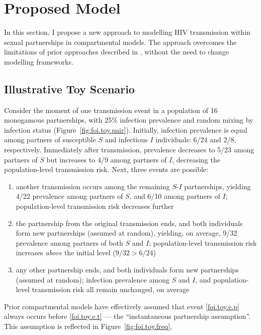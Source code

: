 \clearpage %
\section{Proposed Model}\label{foi.prop}
In this section, I propose a new approach to
modelling HIV transmission within sexual partnerships in compartmental models.
The approach overcomes the limitations of prior approaches described in ,
without the need to change modelling frameworks.
\subsection{Illustrative Toy Scenario}\label{foi.prop.toy}
Consider the moment of one transmission event
in a population of 16 monogamous partnerships, with 25\% infection prevalence
and random mixing by infection status (Figure~\ref{fig:foi.toy.pair}).
Initially, infection prevalence is equal among partners of
susceptible $S$ and infectious $I$ individuals: 6/24 and 2/8, respectively.
Immediately after transmission,
prevalence decreases to 5/23 among partners of $S$ but increases to 4/9 among partners of $I$,
decreasing the population-level transmission risk.
Next, three events are possible:
\begin{enumerate}[label=(\alph*)]
  \item \label{foi.toy.e.t}
  another transmission occurs among the remaining $S$-$I$ partnerships,
  yielding 4/22 prevalence among partners of $S$, and 6/10 among partners of $I$;
  population-level transmission risk decreases further
  \item \label{foi.toy.e.p}
  the partnership from the original transmission ends,
  and both individuals form new partnerships (assumed at random),
  yielding, on average, 9/32 prevalence among partners of both $S$ and $I$;
  population-level transmission risk increases \emph{above} the initial level ($9/32 > 6/24$)
  \item \label{foi.toy.e.q}
  any other partnership ends,
  and both individuals form new partnerships (assumed at random);
  infection prevalence among $S$ and $I$, and population-level transmission risk
  all remain unchanged, on average
\end{enumerate}
Prior compartmental models have effectively assumed that
event \ref{foi.toy.e.p} always occurs before \ref{foi.toy.e.t}
--- \ie the ``instantaneous partnership assumption''.
This assumption is reflected in Figure~\ref{fig:foi.toy.freq},
